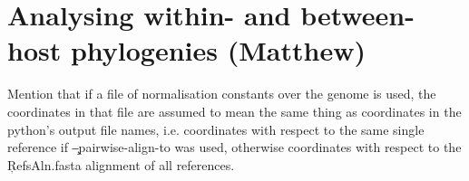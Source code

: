 \part{Analysing within- and between-host phylogenies (Matthew)}

Mention that if a file of normalisation constants over the genome is used, the coordinates in that file are assumed to mean the same thing as coordinates in the python's output file names, i.e. coordinates with respect to the same single reference if \c{--pairwise-align-to} was used, otherwise coordinates with respect to the \c{RefsAln.fasta} alignment of all references.